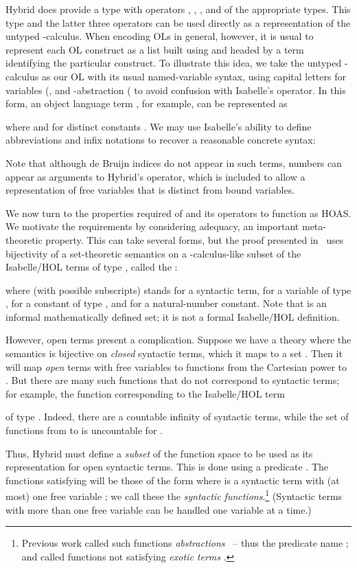 \documentclass[copyright,creativecommons]{eptcs}
\begin{document}
Hybrid does provide a type  with operators , ,
, and  of the appropriate types.  This type and the latter
three operators can be used directly as a representation of the untyped
-calculus.
When encoding OLs in general, however, it is usual to represent each OL
construct as a list built using  and headed by a  term
identifying the particular construct.  
To illustrate this idea, we take the untyped -calculus as our
OL with its usual named-variable syntax, using capital letters for
variables (,  and
-abstraction ( to avoid confusion with
Isabelle's  operator.  In this form, an object language term
  ,
for example, can be represented as

where  and  for
distinct constants .  We may use Isabelle's ability
to define abbreviations and infix notations to recover a reasonable concrete
syntax:
  
Note that although de Bruijn indices do not appear in such terms, numbers
can appear as arguments to Hybrid's  operator, which is
included to allow a representation of free variables that is distinct
from bound variables.

We now turn to the properties required of  and its operators
to function as HOAS.  We motivate the
requirements by considering adequacy, an important meta-theoretic
property.  This can take several forms, but the proof presented
in~\cite{martin:2010a} uses bijectivity of a set-theoretic semantics on
a -calculus-like subset of the Isabelle\slash HOL terms of
type , called the :
  
where  (with possible subscripts) stands for a syntactic term,
 for a variable of type ,  for a constant of
type , and  for a natural-number constant.
Note that  is an informal mathematically defined set; it is not a
formal Isabelle\slash HOL definition.

However, open terms present a complication.  Suppose we have a theory where
the semantics is bijective on \emph{closed} syntactic terms, which it maps
to a set .  Then it will map \emph{open} terms with  free variables
to functions from the Cartesian power  to .  But there are many
such functions that do not correspond to syntactic terms; for example, the
function  corresponding to the Isabelle\slash HOL term
  
of type .  Indeed, there are a countable infinity of
syntactic terms, while the set of functions from  to  is
uncountable for .

Thus, Hybrid must define a \emph{subset} of the function space to be used as
its representation for open syntactic terms.  This is done using a predicate
.  The functions satisfying
 will be those of the form
 where  is
a syntactic term with (at most) one free variable ; we call these the
\emph{syntactic functions}.\footnote{Previous work called such functions \emph{abstractions}
    \cite{ambler/crole/momigliano:2002}~-- thus the predicate name
    ; and called functions not satisfying 
    \emph{exotic terms} \cite{ambler/crole/momigliano:2002,despeyroux/felty/hirschowitz:1995}.
}
(Syntactic terms with more than one free variable can be handled one variable
at a time.)
\end{document}
